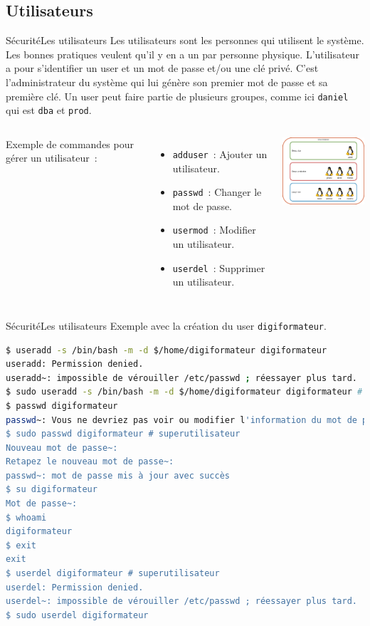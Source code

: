 \documentclass{beamer}
\begin{document}
    \subsection{Utilisateurs}\label{subsec:utilisateurs}
    \begin{frame}{Sécurité}{Les utilisateurs}
        Les utilisateurs sont les personnes qui utilisent le système.
        Les bonnes pratiques veulent qu'il y en a un par personne physique.
        L'utilisateur a pour s'identifier un user et un mot de passe et/ou une clé privé.
        C'est l'administrateur du système qui lui génère son premier mot de passe et sa première clé.
        Un user peut faire partie de plusieurs groupes, comme ici \lstinline{daniel} qui est \lstinline{dba} et \lstinline{prod}.
        \begin{columns}
            Exemple de commandes pour gérer un utilisateur~:
            \begin{itemize}
                \item \lstinline{adduser}~: Ajouter un utilisateur.
                \item \lstinline{passwd}~: Changer le mot de passe.
                \item \lstinline{usermod}~: Modifier un utilisateur.
                \item \lstinline{userdel}~: Supprimer un utilisateur.
            \end{itemize}
            \centering
            \includegraphics[width=5cm]{image/groups-and-users.drawio}
        \end{columns}
    \end{frame}

    \begin{frame}[fragile]{Sécurité}{Les utilisateurs}
        Exemple avec la création du user \lstinline{digiformateur}.
        \begin{lstlisting}[language=bash]
$ useradd -s /bin/bash -m -d $/home/digiformateur digiformateur
useradd: Permission denied.
useradd~: impossible de vérouiller /etc/passwd ; réessayer plus tard.
$ sudo useradd -s /bin/bash -m -d $/home/digiformateur digiformateur # sudo
$ passwd digiformateur
passwd~: Vous ne devriez pas voir ou modifier l'information du mot de passe pour digiformateur.
$ sudo passwd digiformateur # superutilisateur
Nouveau mot de passe~:
Retapez le nouveau mot de passe~:
passwd~: mot de passe mis à jour avec succès
$ su digiformateur
Mot de passe~:
$ whoami
digiformateur
$ exit
exit
$ userdel digiformateur # superutilisateur
userdel: Permission denied.
userdel~: impossible de vérouiller /etc/passwd ; réessayer plus tard.
$ sudo userdel digiformateur
        \end{lstlisting}
    \end{frame}
\end{document}
